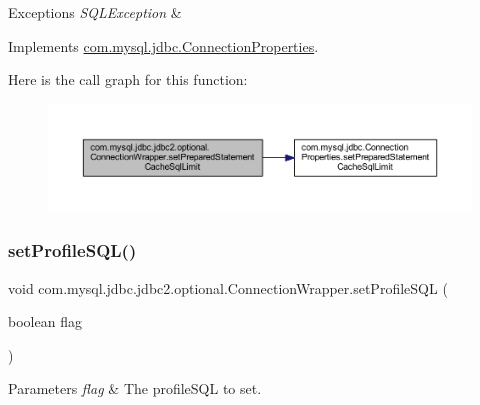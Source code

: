 \begin{DoxyExceptions}{Exceptions}
{\em S\+Q\+L\+Exception} & \\
\hline
\end{DoxyExceptions}


Implements \mbox{\hyperlink{interfacecom_1_1mysql_1_1jdbc_1_1_connection_properties_a7cf7fc262516d73e70ac5dbba0d6a510}{com.\+mysql.\+jdbc.\+Connection\+Properties}}.

Here is the call graph for this function\+:
\nopagebreak
\begin{figure}[H]
\begin{center}
\leavevmode
\includegraphics[width=350pt]{classcom_1_1mysql_1_1jdbc_1_1jdbc2_1_1optional_1_1_connection_wrapper_acdf5cc8f365225e264d7a667a13abcba_cgraph}
\end{center}
\end{figure}
\mbox{\label{classcom_1_1mysql_1_1jdbc_1_1jdbc2_1_1optional_1_1_connection_wrapper_a930d83fb622c7a5e5ac1694599e7b696}} 
\subsubsection{\texorpdfstring{set\+Profile\+S\+Q\+L()}{setProfileSQL()}}
{\footnotesize\ttfamily void com.\+mysql.\+jdbc.\+jdbc2.\+optional.\+Connection\+Wrapper.\+set\+Profile\+S\+QL (\begin{DoxyParamCaption}\item[{boolean}]{flag }\end{DoxyParamCaption})}


\begin{DoxyParams}{Parameters}
{\em flag} & The profile\+S\+QL to set. \\
\hline
\end{DoxyParams}


